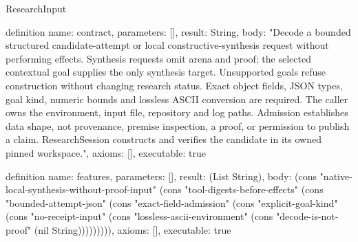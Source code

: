 \begin{lexlean}{ResearchInput}
\begin{semanticmodule}
definition{
 name: contract,
 parameters: [],
 result: String,
 body: "Decode a bounded structured candidate-attempt or local constructive-synthesis request without performing effects. Synthesis requests omit arena and proof; the selected contextual goal supplies the only synthesis target. Unsupported goals refuse construction without changing research status. Exact object fields, JSON types, goal kind, numeric bounds and lossless ASCII conversion are required. The caller owns the environment, input file, repository and log paths. Admission establishes data shape, not provenance, premise inspection, a proof, or permission to publish a claim. ResearchSession constructs and verifies the candidate in its owned pinned workspace.",
 axioms: [],
 executable: true
}

definition{
 name: features,
 parameters: [],
 result: (List String),
 body: (cons "native-local-synthesis-without-proof-input" (cons "tool-digests-before-effects" (cons "bounded-attempt-json" (cons "exact-field-admission" (cons "explicit-goal-kind" (cons "no-receipt-input" (cons "lossless-ascii-environment" (cons "decode-is-not-proof" (nil String))))))))),
 axioms: [],
 executable: true
}

\end{semanticmodule}
\end{lexlean}
